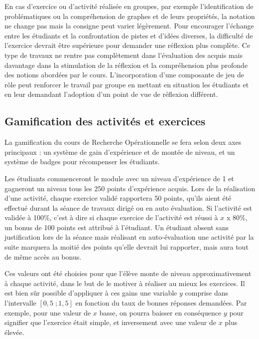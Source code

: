 En cas d'exercice ou d'activité réalisée en groupes, par exemple l'identification de problématiques ou la compréhension de graphes et de leurs propriétés, la notation ne change pas mais la consigne peut varier légèrement. Pour encourager l'échange entre les étudiants et la confrontation de pistes et d'idées diverses, la difficulté de l'exercice devrait être supérieure pour demander une réflexion plus complète. Ce type de travaux ne rentre pas complètement dans l'évaluation des acquis mais davantage dans la stimulation de la réflexion et la compréhension plus profonde des notions abordées par le cours. L'incorporation d'une composante de jeu de rôle peut renforcer le travail par groupe en mettant en situation les étudiants et en leur demandant l'adoption d'un point de vue de réflexion différent. 

\subsection{Gamification des activités et exercices}
La gamification du cours de Recherche Opérationnelle se fera selon deux axes principaux : un système de gain d'expérience et de montée de niveau, et un système de badges pour récompenser les étudiants. \par

Les étudiants commenceront le module avec un niveau d'expérience de 1 et gagneront un niveau tous les 250 points d'expérience acquis. Lors de la réalisation d'une activité, chaque exercice validé rapportera 50 points, qu'ils aient été effectué durant la séance de travaux dirigé ou en auto évaluation. Si l'activité est validée à 100\%, c'est à dire si chaque exercice de l'activité est réussi à $x$ x 80\%, un bonus de 100 points est attribué à l'étudiant. Un étudiant absent sans justification lors de la séance mais réalisant en auto-évaluation une activité par la suite marquera la moitié des points qu'elle devrait lui rapporter, mais aura tout de même accès au bonus. \par

Ces valeurs ont été choisies pour que l'élève monte de niveau approximativement à chaque activité, dans le but de le motiver à réaliser au mieux les exercices. Il est bien sûr possible d'appliquer à ces gains une variable $y$ comprise dans l'intervalle $[0,5\;;1,5]$ en fonction du taux de bonnes réponses demandées. Par exemple, pour une valeur de $x$ basse, on pourra baisser en conséquence $y$ pour signifier que l'exercice était simple, et inversement avec une valeur de $x$ plus élevée. \par

